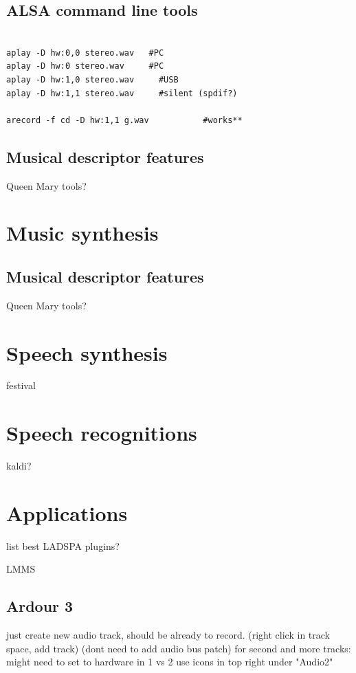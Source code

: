 \documentclass[oneside,english]{scrbook}
\begin{document}
\section{ALSA command line tools}
\begin{lstlisting}

aplay -D hw:0,0 stereo.wav   #PC
aplay -D hw:0 stereo.wav     #PC
aplay -D hw:1,0 stereo.wav     #USB
aplay -D hw:1,1 stereo.wav     #silent (spdif?)

arecord -f cd -D hw:1,1 g.wav           #works**

\end{lstlisting}

\section{Musical descriptor features}
Queen Mary tools?


\chapter{Music synthesis}


\section{Musical descriptor features}
Queen Mary tools?
\chapter{Speech synthesis}

festival


\chapter{Speech recognitions}

kaldi?


\chapter{Applications}

list best LADSPA plugins?

LMMS

\section{Ardour 3}

just create new audio track, should be already to record. 
	(right click in track space, add track)
	(dont need to add audio bus patch) 
	for second and more tracks:
		might need to set to hardware in 1 vs 2
			use icons in top right under "Audio2"
\end{document}
